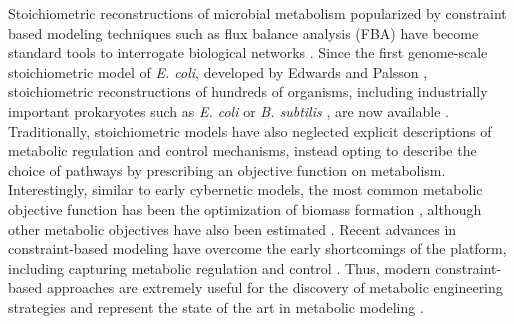 \documentclass[journal=asbcd6,manuscript=article]{achemso}
\begin{document}
Stoichiometric reconstructions of microbial metabolism popularized by constraint based modeling techniques such as flux balance analysis (FBA) have become standard tools to interrogate biological networks \cite{2012_lewis_palsson_NatRevMicrobio}.
Since the first genome-scale stoichiometric model of \textit{E. coli}, developed by Edwards and Palsson \cite{2000_edwards_palsson_PNAS}, stoichiometric reconstructions of hundreds of organisms, including industrially important prokaryotes such as \textit{E. coli} \cite{Feist:2007aa} or \textit{B. subtilis} \cite{Oh:2007aa}, are now available \cite{2009_feist_palsson_NatRevMicrobio}.
Traditionally, stoichiometric models have also neglected explicit descriptions of metabolic regulation and control mechanisms, instead opting to describe the choice of pathways by prescribing an objective function on metabolism.
Interestingly, similar to early cybernetic models, the most common metabolic objective function has been the optimization of biomass formation \cite{2002_ibarra_edwards_palsson_Nat}, although other metabolic objectives have also been estimated \cite{2007_schuetz_sauer_MolSysBio}.
Recent advances in constraint-based modeling have overcome the early shortcomings of the platform, including capturing metabolic regulation and control \cite{2013_hyduke_lewis_palsson_MolBioSys}. Thus, modern constraint-based approaches are extremely useful for the discovery of metabolic engineering strategies and represent the state of the art in metabolic modeling \cite{2013_mccloskey_palsson_feist_MolSysBio, 2012_zomorrodi_maranas_MetaEng}.
\end{document}

